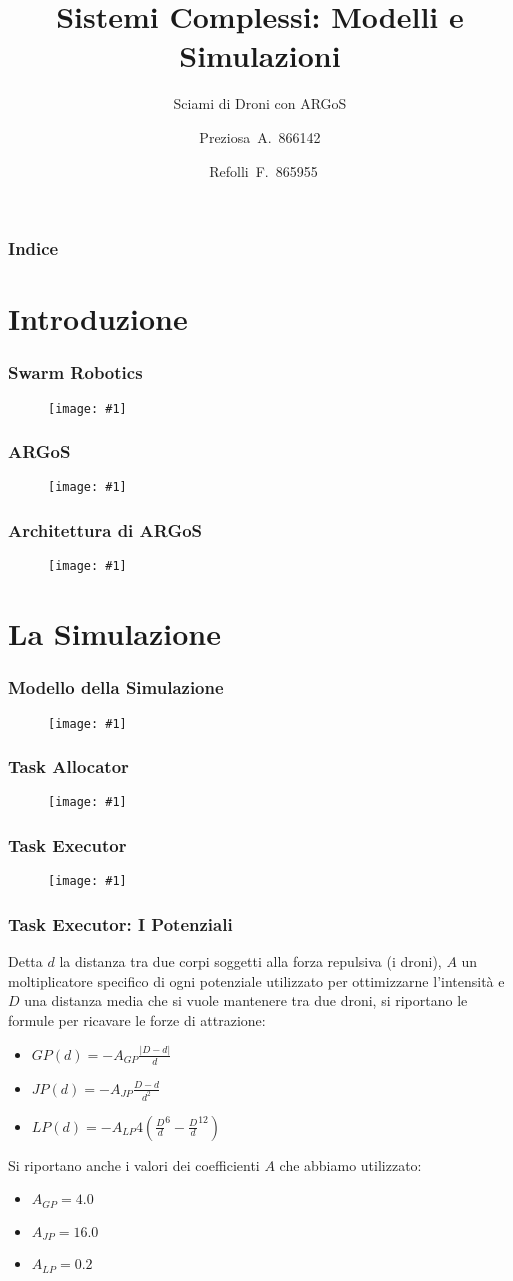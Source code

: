 \documentclass{beamer}
\title{Sistemi Complessi: Modelli e Simulazioni}
\subtitle{Sciami di Droni con ARGoS}
\author{Preziosa~A.~866142 \and ~Refolli~F.~865955}
\newcommand{\putimage}[2] {
  \begin{figure}[H]
    \centering
    \texttt{[image: \#1]}
	\end{figure}
}
\begin{document}
\frame{\titlepage}

\begin{frame}
\frametitle{Indice}
\tableofcontents
\end{frame}

\section{Introduzione}

\begin{frame}
\frametitle{Swarm Robotics}
  \putimage{images/swarm\_robotics.png}{0.99}
\end{frame}

\begin{frame}
\frametitle{ARGoS}
\putimage{images/argos3.png}{0.85}
\end{frame}

\begin{frame}
\frametitle{Architettura di ARGoS}
\putimage{images/architecture.png}{0.85}
\end{frame}

\section{La Simulazione}

\begin{frame}
\frametitle{Modello della Simulazione}
\putimage{images/simulation-model.png}{0.99}
\end{frame}

\begin{frame}
\frametitle{Task Allocator}
\putimage{images/task-allocator.png}{0.70}
\end{frame}

\begin{frame}
\frametitle{Task Executor}
\putimage{images/task-executor.png}{0.99}
\end{frame}

\begin{frame}
\frametitle{Task Executor: I Potenziali}
Detta $d$ la distanza tra due corpi soggetti alla forza repulsiva (i droni), $A$ un moltiplicatore specifico di ogni potenziale utilizzato per ottimizzarne l'intensit\`a e $D$ una distanza media che si vuole mantenere tra due droni, si riportano le formule per ricavare le forze di attrazione:

\begin{itemize}
  \item $GP(d) = -A_{GP} \frac {|D - d|} {d}$
  \item $JP(d) = -A_{JP} \frac {D - d} {d^2}$
  \item $LP(d) = -A_{LP} 4 ({\frac {D} {d}}^6 - {\frac {D} {d}}^{12})$
\end{itemize}

Si riportano anche i valori dei coefficienti $A$ che abbiamo utilizzato:

\begin{itemize}
  \item $A_{GP} = 4.0$
  \item $A_{JP} = 16.0$
  \item $A_{LP} = 0.2$
\end{itemize}
\end{frame}
\end{document}
